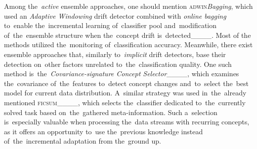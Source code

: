 Among the~\textit{active} ensemble approaches, one should mention \textsc{adwin}\textit{Bagging}, which used an \textit{Adaptive Windowing} drift detector combined with \textit{online bagging} to~enable the~incremental learning of~classifier pool and~modification of~the~ensemble structure when the~concept drift is~detected____. Most of the methods utilized the~monitoring of~classification accuracy. Meanwhile, there exist ensemble approaches that, similarly to~\textit{implicit} drift detectors, base their detection on~other factors unrelated to~the~classification quality. One such method is~the~\textit{Covariance-signature Concept Selector}____, which examines the~covariance of~the~features to~detect concept changes and~to~select the~best model for current data distribution. A~similar strategy was used in~the~already mentioned \textsc{ficsum}____, which selects the~classifier dedicated to~the~currently solved task based on~the~gathered meta-information. Such a~selection is~especially valuable when processing the~data streams with recurring concepts, as it offers an opportunity to~use the~previous knowledge instead of~the~incremental adaptation from the~ground up.